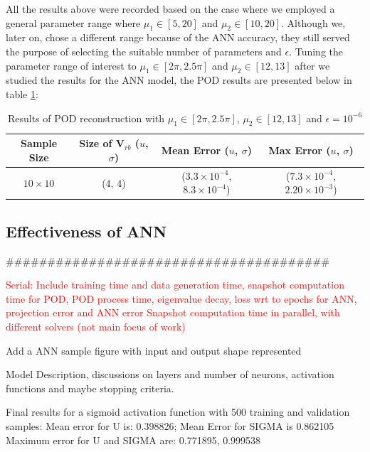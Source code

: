 All the results above were recorded based on the case where we employed a general parameter range where $\mu_1 \in [5, 20]$ and $\mu_2 \in [10, 20]$. Although we, later on, chose a different range because of the ANN accuracy, they still served the purpose of selecting the suitable number of parameters and $\epsilon$. Tuning the parameter range of interest to $\mu_1 \in [2\pi, 2.5\pi]$ and $\mu_2 \in [12, 13]$ after we studied the results for the ANN model, the POD results are presented below in table \ref{tab:POD_results_final_range}:

\begin{table}[htb]
    \centering
    \caption{Results of POD reconstruction with $\mu_1 \in [2\pi, 2.5\pi]$, $\mu_2 \in [12, 13]$ and $\epsilon = 10^{-6}$}
    \small
    \begin{tabular}{c|c|c|c}
        \toprule
        Sample Size & Size of $\mathbf{V}_{rb}$ ($u$, $\sigma$) & Mean Error ($u$, $\sigma$) & Max Error ($u$, $\sigma$) \\
        \midrule
        $10 \times 10$ & (4, 4) & ($3.3 \times 10^{-4}$, $8.3 \times 10^{-4}$) & ($7.3 \times 10^{-4}$, $2.20 \times 10^{-3}$) \\
        \bottomrule
    \end{tabular}
    \label{tab:POD_results_final_range}
\end{table}

\subsection{Effectiveness of ANN}


\vspace{1cm}
\#\#\#\#\#\#\#\#\#\#\#\#\#\#\#\#\#\#\#\#\#\#\#\#\#\#\#\#\#\#\#\#\#\#\#\#\#\#\#

\textcolor{red}{Serial: Include training time and data generation time, snapshot computation time for POD, POD process time, eigenvalue decay, loss wrt to epochs for ANN, projection error and ANN error
Snapshot computation time in parallel, with different solvers (not main focus of work)}


Add a ANN sample figure with input and output shape represented

Model Description, discussions on layers and number of neurons, activation functions and maybe stopping criteria. 


Final results for a sigmoid activation function with 500 training and validation samples:
Mean error for U is: 0.398826; Mean Error for SIGMA is 0.862105
Maximum error for U and SIGMA are: 0.771895, 0.999538

